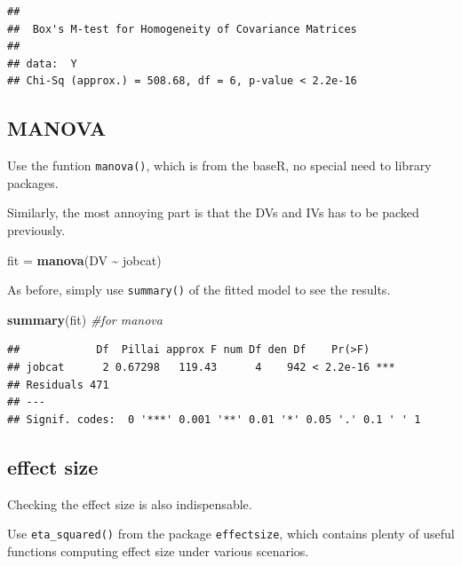 \documentclass[
]{ctexart}
\newenvironment{Shaded}{\begin{snugshade}}{\end{snugshade}}
\newcommand{\CommentTok}[1]{\textcolor[rgb]{0.56,0.35,0.01}{\textit{#1}}}
\newcommand{\FunctionTok}[1]{\textcolor[rgb]{0.13,0.29,0.53}{\textbf{#1}}}
\newcommand{\NormalTok}[1]{#1}
\newcommand{\OtherTok}[1]{\textcolor[rgb]{0.56,0.35,0.01}{#1}}
\newcommand{\SpecialCharTok}[1]{\textcolor[rgb]{0.81,0.36,0.00}{\textbf{#1}}}
\begin{document}
\begin{verbatim}
## 
##  Box's M-test for Homogeneity of Covariance Matrices
## 
## data:  Y
## Chi-Sq (approx.) = 508.68, df = 6, p-value < 2.2e-16
\end{verbatim}

\hypertarget{manova-1}{%
\subsection{MANOVA}\label{manova-1}}

Use the funtion \texttt{manova()}, which is from the baseR, no special
need to library packages.

Similarly, the most annoying part is that the DVs and IVs has to be
packed previously.

\begin{Shaded}
\begin{Highlighting}[]
\NormalTok{fit }\OtherTok{=} \FunctionTok{manova}\NormalTok{(DV }\SpecialCharTok{\textasciitilde{}}\NormalTok{ jobcat)}
\end{Highlighting}
\end{Shaded}

As before, simply use \texttt{summary()} of the fitted model to see the
results.

\begin{Shaded}
\begin{Highlighting}[]
\FunctionTok{summary}\NormalTok{(fit)  }\CommentTok{\#for manova}
\end{Highlighting}
\end{Shaded}

\begin{verbatim}
##            Df  Pillai approx F num Df den Df    Pr(>F)    
## jobcat      2 0.67298   119.43      4    942 < 2.2e-16 ***
## Residuals 471                                             
## ---
## Signif. codes:  0 '***' 0.001 '**' 0.01 '*' 0.05 '.' 0.1 ' ' 1
\end{verbatim}

\hypertarget{effect-size}{%
\subsection{effect size}\label{effect-size}}

Checking the effect size is also indispensable.

Use \texttt{eta\_squared()} from the package \texttt{effectsize}, which
contains plenty of useful functions computing effect size under various
scenarios.
\end{document}

